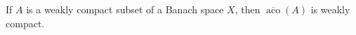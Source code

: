 If $A$ is a weakly compact subset of a Banach space $X$, then $\overline{\operatorname{aco}}(A)$ is weakly compact.